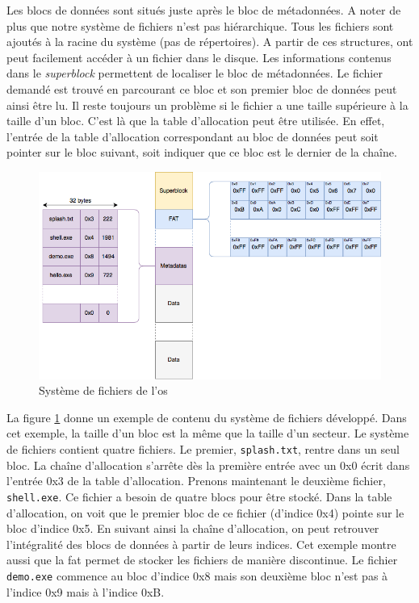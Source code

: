 Les blocs de données sont situés juste après le bloc de métadonnées. A noter de
plus que notre système de fichiers n'est pas hiérarchique. Tous les fichiers sont
ajoutés à la racine du système (pas de répertoires). A partir de ces structures,
ont peut facilement accéder à un fichier dans le disque. Les informations contenus
dans le \textit{superblock} permettent de localiser le bloc de métadonnées. Le
fichier demandé est trouvé en parcourant ce bloc et son premier bloc de données
peut ainsi être lu. Il reste toujours un problème si le fichier a une taille supérieure
à la taille d'un bloc. C'est là que la table d'allocation peut être
utilisée. En effet, l'entrée de la table d'allocation correspondant au bloc
de données peut soit pointer sur le bloc suivant, soit indiquer que ce bloc est
le dernier de la chaîne. \newpage

\begin{figure}[!h]
  \centering
  \includegraphics[scale=0.6]{images/microfs.png}
  \caption{Système de fichiers de l'\acrshort{os}}
  \label{microfs}
\end{figure}

La figure \ref{microfs} donne un exemple de contenu du système
de fichiers développé. Dans cet exemple, la taille d'un bloc est la même que la
taille d'un secteur. Le système de fichiers contient quatre fichiers. Le premier,
\texttt{splash.txt}, rentre dans un seul bloc. La chaîne d'allocation
s'arrête dès la première entrée avec un 0x0 écrit dans l'entrée 0x3 de la table
d'allocation. Prenons maintenant le deuxième fichier, \texttt{shell.exe}.
Ce fichier a besoin de quatre blocs pour être stocké. Dans la table d'allocation,
on voit que le premier bloc de ce fichier (d'indice 0x4) pointe sur le bloc
d'indice 0x5. En suivant ainsi la chaîne d'allocation, on peut retrouver l'intégralité
des blocs de données à partir de leurs indices. Cet exemple montre aussi que la
\acrshort{fat} permet de stocker les fichiers de manière discontinue. Le fichier
\texttt{demo.exe} commence au bloc d'indice 0x8 mais son deuxième bloc
n'est pas à l'indice 0x9 mais à l'indice 0xB.

